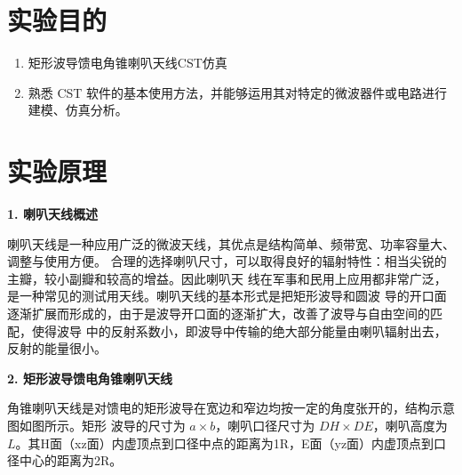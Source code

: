 \documentclass[12pt,hyperref,a4paper,UTF8]{ctexart}
\begin{document}
\cover

%
%

\thispagestyle{empty} %

\newpage
\tableofcontents

\newpage


\section{实验目的}

\begin{enumerate}[itemsep=-5pt, topsep=0pt, partopsep=0pt]
    \item 矩形波导馈电角锥喇叭天线CST仿真
    \item 熟悉 CST 软件的基本使用方法，并能够运用其对特定的微波器件或电路进行建模、仿真分析。
\end{enumerate}

\section{实验原理}

\textbf{1. 喇叭天线概述}

喇叭天线是一种应用广泛的微波天线，其优点是结构简单、频带宽、功率容量大、调整与使用方便。
合理的选择喇叭尺寸，可以取得良好的辐射特性：相当尖锐的主瓣，较小副瓣和较高的增益。因此喇叭天
线在军事和民用上应用都非常广泛，是一种常见的测试用天线。喇叭天线的基本形式是把矩形波导和圆波
导的开口面逐渐扩展而形成的，由于是波导开口面的逐渐扩大，改善了波导与自由空间的匹配，使得波导
中的反射系数小，即波导中传输的绝大部分能量由喇叭辐射出去，反射的能量很小。

\textbf{2. 矩形波导馈电角锥喇叭天线 }

角锥喇叭天线是对馈电的矩形波导在宽边和窄边均按一定的角度张开的，结构示意图如图所示。矩形
波导的尺寸为 $a×b$，喇叭口径尺寸为 $DH×DE$，喇叭高度为 $L$。其H面（xz面）内虚顶点到口径中点的距离为1R，E面（yz面）内虚顶点到口径中心的距离为2R。
\end{document}
